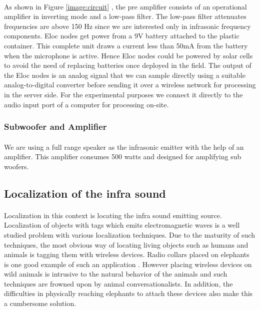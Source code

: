 \documentclass[12pt]{article}
\numberwithin{figure}{section}
\numberwithin{table}{section}
\begin{document}
\paragraph{}
As shown in Figure \ref{image:circuit} , the pre amplifier consists of an operational amplifier in inverting mode and a low-pass filter. The low-pass filter attenuates frequencies are above 150 Hz since we are interested only in infrasonic frequency components. Eloc nodes get power from a 9V battery attached to the plastic container. This complete unit draws a current less than 50mA from the battery when the microphone is active. Hence Eloc nodes could be powered by solar cells to avoid the need of replacing batteries once deployed in the field. The output of the Eloc nodes is an analog signal that we can sample directly using a suitable analog-to-digital converter before sending it over a wireless network for processing in the server side. For the experimental purposes we connect it directly to the audio input port of a computer for processing on-site.

\subsubsection{Subwoofer and Amplifier}
\paragraph{}
We are using a full range speaker as the infrasonic emitter with the help of an amplifier. This amplifier consumes 500 watts and designed for amplifying sub woofers.



\newpage

\subsection{Localization of the infra sound}
\paragraph{}
Localization in this context is locating the infra sound emitting source. Localization of objects with tags which emits electromagnetic waves is a well studied problem with various localization techniques. Due to the maturity of such techniques,
the most obvious way of locating living objects such as humans and animals is tagging them with wireless devices. Radio collars placed on elephants is one good example of such an application \cite{32}. However placing wireless devices on wild animals is intrusive to the natural behavior of the animals and such techniques are frowned upon by animal conversationalists. In addition, the difficulties in physically reaching elephants to attach these devices also make this a cumbersome solution.
\end{document}
